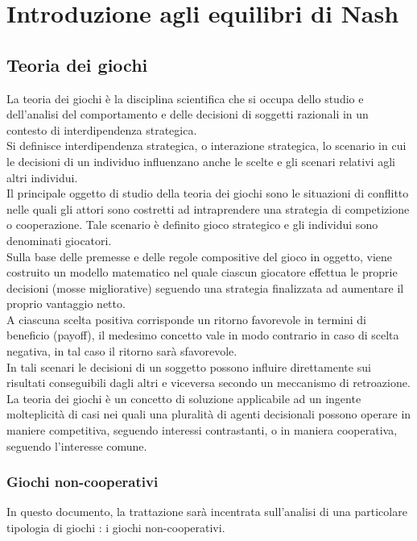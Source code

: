 \chapter{Introduzione agli equilibri di Nash}

\section{Teoria dei giochi}
\justify
La teoria dei giochi è la disciplina scientifica che si occupa dello studio e dell'analisi del comportamento e delle decisioni di soggetti razionali in un contesto di interdipendenza strategica.\\

Si definisce interdipendenza strategica, o interazione strategica, lo scenario in cui le decisioni di un individuo influenzano anche le scelte e gli scenari relativi agli altri individui.\\

Il principale oggetto di studio della teoria dei giochi sono le situazioni di conflitto nelle quali gli attori sono costretti ad intraprendere una strategia di competizione o cooperazione. Tale scenario è definito gioco strategico e gli individui sono denominati giocatori.\\

Sulla base delle premesse e delle regole compositive del gioco in oggetto, viene costruito un modello matematico nel quale ciascun giocatore effettua le proprie decisioni (mosse migliorative) seguendo una strategia finalizzata ad aumentare il proprio vantaggio netto.\\

A ciascuna scelta positiva corrisponde un ritorno favorevole in termini di beneficio (payoff), il medesimo concetto vale in modo contrario in caso di scelta negativa, in tal caso il ritorno sarà sfavorevole.\\

In tali scenari le decisioni di un soggetto possono influire direttamente sui risultati conseguibili dagli altri e viceversa secondo un meccanismo di retroazione.\\

La teoria dei giochi è un concetto di soluzione applicabile ad un ingente molteplicità di casi nei quali una pluralità di agenti decisionali possono operare in maniere competitiva, seguendo interessi contrastanti, o in maniera  cooperativa, seguendo l'interesse comune.\\

\subsection{Giochi non-cooperativi}
\justify
In questo documento, la trattazione sarà incentrata sull'analisi di una particolare tipologia di giochi : i giochi non-cooperativi.\\


